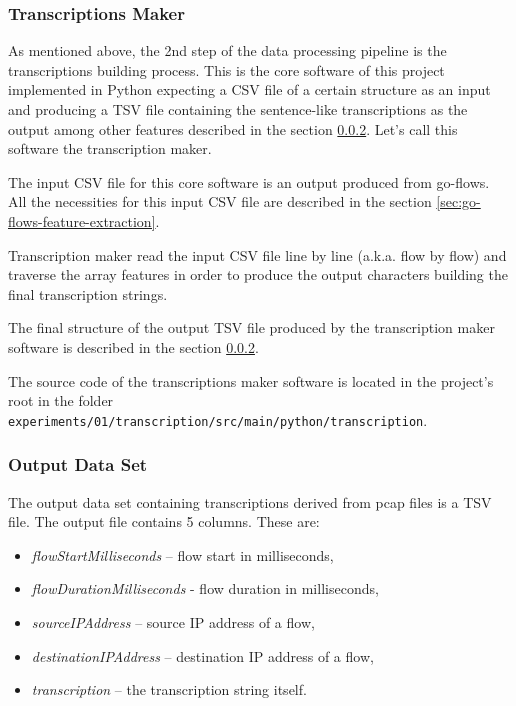 \documentclass{article}
\begin{document}
\subsubsection{Transcriptions Maker}
As mentioned above, the 2nd step of the data processing pipeline is the transcriptions building process. This is the core software of this project implemented in Python expecting a CSV file of a certain structure as an input and producing a TSV file containing the sentence-like transcriptions as the output among other features described in the section \ref{sec-output-dataset}. Let's call this software the transcription maker.

The input CSV file for this core software is an output produced from go-flows. All the necessities for this input CSV file are described in the section \ref{sec:go-flows-feature-extraction}.

Transcription maker read the input CSV file line by line (a.k.a. flow by flow) and traverse the array features in order to produce the output characters building the final transcription strings.

The final structure of the output TSV file produced by the transcription maker software is described in the section \ref{sec-output-dataset}.

The source code of the transcriptions maker software is located in the project's root in the folder \verb|experiments/01/transcription/src/main/python/transcription|.


\subsubsection{Output Data Set}\label{sec-output-dataset}

The output data set containing transcriptions derived from pcap files is a TSV file. The output file contains 5 columns. These are:
\begin{itemize}
    \item \textit{flowStartMilliseconds} -- flow start in milliseconds,
    \item \textit{flowDurationMilliseconds} - flow duration in milliseconds,
    \item \textit{sourceIPAddress} -- source IP address of a flow,
    \item \textit{destinationIPAddress} -- destination IP address of a flow,
    \item \textit{transcription} -- the transcription string itself.
\end{itemize}
\end{document}
